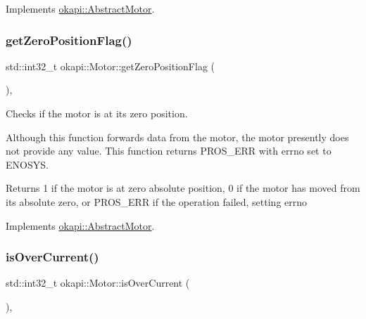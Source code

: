 Implements \mbox{\hyperlink{classokapi_1_1AbstractMotor_a855b35b508e90074f21662b06ad2a0c8}{okapi\+::\+Abstract\+Motor}}.

\mbox{\label{classokapi_1_1Motor_a2640dea57e59a19aa6000da2c7cefdeb}} 
\subsubsection{\texorpdfstring{getZeroPositionFlag()}{getZeroPositionFlag()}}
{\footnotesize\ttfamily std\+::int32\+\_\+t okapi\+::\+Motor\+::get\+Zero\+Position\+Flag (\begin{DoxyParamCaption}{ }\end{DoxyParamCaption})\hspace{0.3cm}{\ttfamily [override]}, {\ttfamily [virtual]}}

Checks if the motor is at its zero position.

Although this function forwards data from the motor, the motor presently does not provide any value. This function returns P\+R\+O\+S\+\_\+\+E\+RR with errno set to E\+N\+O\+S\+YS.

\begin{DoxyReturn}{Returns}
1 if the motor is at zero absolute position, 0 if the motor has moved from its absolute zero, or P\+R\+O\+S\+\_\+\+E\+RR if the operation failed, setting errno 
\end{DoxyReturn}


Implements \mbox{\hyperlink{classokapi_1_1AbstractMotor_a07079ee87a07b98b7008f2ce91c645ea}{okapi\+::\+Abstract\+Motor}}.

\mbox{\label{classokapi_1_1Motor_aff882cb26c477355551d7bbf8e5c03bb}} 
\subsubsection{\texorpdfstring{isOverCurrent()}{isOverCurrent()}}
{\footnotesize\ttfamily std\+::int32\+\_\+t okapi\+::\+Motor\+::is\+Over\+Current (\begin{DoxyParamCaption}{ }\end{DoxyParamCaption})\hspace{0.3cm}{\ttfamily [override]}, {\ttfamily [virtual]}}

